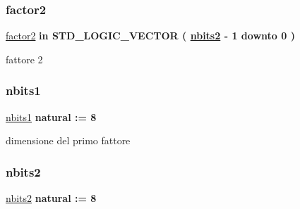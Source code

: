 \subsubsection{\texorpdfstring{factor2}{factor2}}
{\footnotesize\ttfamily \hyperlink{group___multiplier_gac140852334303b430bbd49689cc689dd}{factor2} {\bfseries \textcolor{vhdlchar}{in}\textcolor{vhdlchar}{ }} {\bfseries \textcolor{vhdlchar}{S\+T\+D\+\_\+\+L\+O\+G\+I\+C\+\_\+\+V\+E\+C\+T\+OR}\textcolor{vhdlchar}{ }\textcolor{vhdlchar}{(}\textcolor{vhdlchar}{ }\textcolor{vhdlchar}{ }\textcolor{vhdlchar}{ }\textcolor{vhdlchar}{ }{\bfseries \hyperlink{group___multiplier_ga8b5bdaff4c3669528aaec95a07e17c2a}{nbits2}} \textcolor{vhdlchar}{-\/}\textcolor{vhdlchar}{ } \textcolor{vhdldigit}{1} \textcolor{vhdlchar}{ }\textcolor{vhdlchar}{downto}\textcolor{vhdlchar}{ }\textcolor{vhdlchar}{ } \textcolor{vhdldigit}{0} \textcolor{vhdlchar}{ }\textcolor{vhdlchar}{)}\textcolor{vhdlchar}{ }} \hspace{0.3cm}{\ttfamily [Port]}}



fattore 2 

\mbox{\label{group___multiplier_ga4ede473cdc13e75fe66fbd548b62e432}} 
\subsubsection{\texorpdfstring{nbits1}{nbits1}}
{\footnotesize\ttfamily \hyperlink{group___multiplier_ga4ede473cdc13e75fe66fbd548b62e432}{nbits1} {\bfseries \textcolor{vhdlchar}{ }} {\bfseries \textcolor{vhdlchar}{natural}\textcolor{vhdlchar}{ }\textcolor{vhdlchar}{ }\textcolor{vhdlchar}{\+:}\textcolor{vhdlchar}{=}\textcolor{vhdlchar}{ }\textcolor{vhdlchar}{ } \textcolor{vhdldigit}{8} \textcolor{vhdlchar}{ }} \hspace{0.3cm}{\ttfamily [Generic]}}



dimensione del primo fattore 

\mbox{\label{group___multiplier_ga8b5bdaff4c3669528aaec95a07e17c2a}} 
\subsubsection{\texorpdfstring{nbits2}{nbits2}}
{\footnotesize\ttfamily \hyperlink{group___multiplier_ga8b5bdaff4c3669528aaec95a07e17c2a}{nbits2} {\bfseries \textcolor{vhdlchar}{ }} {\bfseries \textcolor{vhdlchar}{natural}\textcolor{vhdlchar}{ }\textcolor{vhdlchar}{ }\textcolor{vhdlchar}{\+:}\textcolor{vhdlchar}{=}\textcolor{vhdlchar}{ }\textcolor{vhdlchar}{ } \textcolor{vhdldigit}{8} \textcolor{vhdlchar}{ }} \hspace{0.3cm}{\ttfamily [Generic]}}



